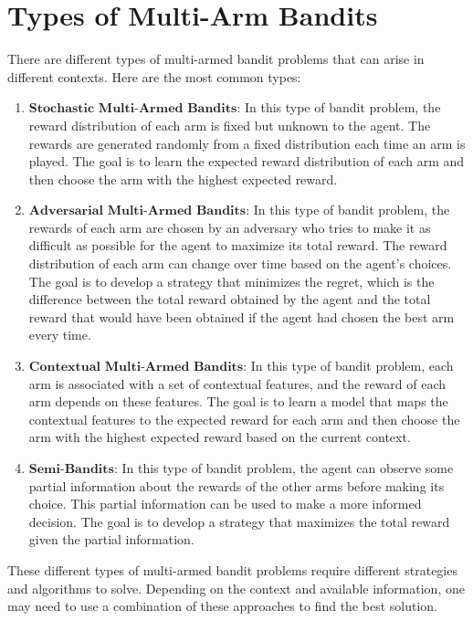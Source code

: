 \documentclass{article}
\begin{document}
\section{Types of Multi-Arm Bandits}
There are different types of multi-armed bandit problems that can arise in different contexts. Here are the most common types:

\begin{enumerate}
    
\item $\textbf{Stochastic Multi-Armed Bandits:}$ In this type of bandit problem, the reward distribution of each arm is fixed but unknown to the agent. The rewards are generated randomly from a fixed distribution each time an arm is played. The goal is to learn the expected reward distribution of each arm and then choose the arm with the highest expected reward. 

\item $\textbf{Adversarial Multi-Armed Bandits:}$ In this type of bandit problem, the rewards of each arm are chosen by an adversary who tries to make it as difficult as possible for the agent to maximize its total reward. The reward distribution of each arm can change over time based on the agent's choices. The goal is to develop a strategy that minimizes the regret, which is the difference between the total reward obtained by the agent and the total reward that would have been obtained if the agent had chosen the best arm every time.

\item $\textbf{Contextual Multi-Armed Bandits:}$ In this type of bandit problem, each arm is associated with a set of contextual features, and the reward of each arm depends on these features. The goal is to learn a model that maps the contextual features to the expected reward for each arm and then choose the arm with the highest expected reward based on the current context. 

\item $\textbf{Semi-Bandits:}$ In this type of bandit problem, the agent can observe some partial information about the rewards of the other arms before making its choice. This partial information can be used to make a more informed decision. The goal is to develop a strategy that maximizes the total reward given the partial information.
\end{enumerate}

These different types of multi-armed bandit problems require different strategies and algorithms to solve. Depending on the context and available information, one may need to use a combination of these approaches to find the best solution.
\end{document}
